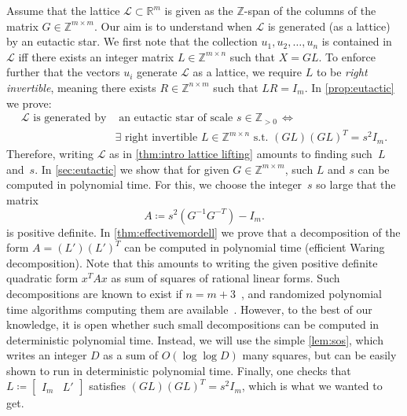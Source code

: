 \documentclass[a4paper,USenglish,cleveref,numberwithinsect]{lipics-v2021}
\newcommand{\ZZ}{\mathbb{Z}}
\newcommand{\RR}{\mathbb{R}}
\numberwithin{equation}{section}
\begin{document}
Assume that the lattice $\mathcal{L}\subset\RR^m$
is given as the $\ZZ$-span of the columns of the matrix $G\in\ZZ^{m\times m}$.
Our aim is to understand when $\mathcal{L}$ is generated (as a lattice) by an eutactic star.
We first note that the collection $u_1,u_2,\dots,u_n$ is contained in $\mathcal{L}$
iff there exists an integer matrix $L\in\ZZ^{m\times n}$ such that $X=GL$.
To enforce further that the vectors $u_i$ generate $\mathcal{L}$ as a lattice,
we require $L$ to be \textit{right invertible},
meaning there exists $R\in\ZZ^{n\times m}$ such that $LR=I_m$.
In \cref{prop:eutactic} we prove:
\begin{equation*}%
\begin{split}
 \mathcal{L}\text{ is generated by}&\text{ an eutactic star of scale } s\in \ZZ_{>0}\, \iff\, \\
 &\exists \text{ right invertible }L\in\ZZ^{m\times n} \text{ s.t. }
    (GL)(GL)^T = s^2 I_m.
\end{split}
\end{equation*}
Therefore, %
writing $\mathcal{L}$ as in \cref{thm:intro lattice lifting} amounts to finding such~$L$ and~$s$.
In \cref{sec:eutactic} we show that for given $G\in\ZZ^{m\times m}$,
such $L$ and $s$ can be computed in polynomial time.
For this, we choose the integer~$s$ so large that the matrix
\[
A\coloneqq s^2 (G^{-1}G^{-T})-I_m.
\]
is positive definite.
In \cref{thm:effectivemordell} we prove that a decomposition of the form $A=(L')(L')^T$
can be computed in polynomial time (efficient Waring decomposition).
Note that this amounts to writing the given positive definite quadratic form $x^T Ax$
as sum of squares of rational linear forms.
Such decompositions are known to exist if $n=m+3$~\cite{mordell},
and randomized polynomial time algorithms
computing them are available~\cite{rabin-shallit}.
However, to the best of our knowledge, it is open
whether such small decompositions can be computed in deterministic polynomial time.
Instead, we will use the simple \cref{lem:sos}, which writes an integer $D$ as a sum of $O(\log\log D)$ many squares,
but can be easily shown to run in deterministic polynomial time.
Finally, one checks that $L\coloneqq \begin{bmatrix} I_m & L'\end{bmatrix}$
satisfies $(GL)(GL)^T=s^2 I_m$, which is what we wanted to get.
\end{document}
